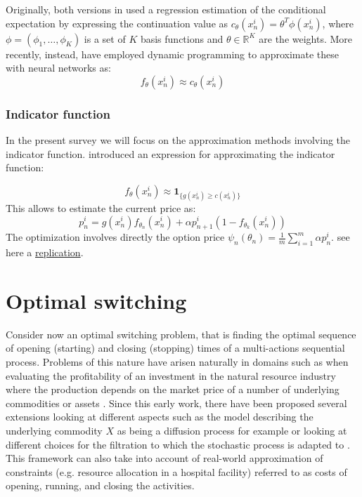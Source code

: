 \documentclass{article}
\begin{document}
Originally, both versions in \citep{longstaff2001valuing, tsitsiklis2001regression} used a regression estimation of the conditional expectation by expressing the continuation value as $c_{\theta}(x^i_n)=\theta^T \phi (x^i_n)$, where $\phi=(\phi_1, \ldots, \phi_K)$ is a set of $K$ basis functions and $\theta \in \mathbb{R}^K$ are the weights. More recently, instead, \cite{kohler2010pricing, lapeyre2021neural, becker2020pricing} have employed dynamic programming to approximate these with neural networks as:
\begin{equation}\label{eq8}
   f_{\theta}(x_n^i) \approx c_{\theta}(x_n^i) 
\end{equation}

\subsubsection*{Indicator function} 
In the present survey we will focus on the approximation methods involving the indicator function. \cite{becker2019deep} introduced an expression for approximating the indicator function: 

\begin{equation}\label{eq9}
       f_{\theta}(x_n^i) \approx \mathbf{1}_{\{ g(x_n^i) \geq c(x_n^i)\}}
    \end{equation}
This allows to estimate the current price as:
\begin{equation}\label{q10}
    p^i_n = g(x_n^i)f_{\theta_n}(x^i_n)+\alpha p^i_{n+1}(1-f_{\theta_k}(x_n^i))
\end{equation}
The optimization involves directly the option price $\psi_n(\theta_n) = \frac{1}{m} \sum_{i=1}^m \alpha p^i_n$. see here a \href{https://github.com/claudia-viaro/optimal_stopping-switching/tree/main/optimal_stopping}{replication}.   

\section{Optimal switching}
Consider now an optimal switching problem, that is finding the optimal sequence of opening (starting) and closing (stopping) times of a multi-actions sequential process. Problems of this nature have arisen naturally in domains such as when evaluating the profitability of an investment in the natural resource industry where the production depends on the market price of a number of underlying commodities or assets \citep{brennan1985evaluating}. Since this early work, there have been proposed several extensions looking at different aspects such as the model describing the underlying commodity $X$ as being a diffusion process for example \citep{knudsen1998valuation, zervos2003problem} or looking at different choices for the filtration to which the stochastic process is adapted to \citep{hamadene2006starting, hamadene2007starting}. This framework can also take into account of real-world approximation of constraints (e.g. resource allocation in a hospital facility) referred to as costs of opening, running, and closing the activities.
\end{document}
